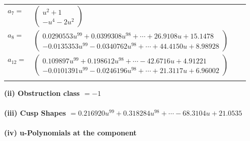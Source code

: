 \documentclass[1p]{elsarticle_modified}
\theoremstyle{definition}
\begin{document}
\begin{tabular}{m{7pt} m{180pt} m{7pt} m{180pt} }
\flushright $a_{7}=$&$\begin{pmatrix}u^2+1\\- u^4-2 u^2\end{pmatrix}$ \\
\flushright $a_{8}=$&$\begin{pmatrix}0.0290553 u^{99}+0.0399308 u^{98}+\cdots+26.9108 u+15.1478\\-0.0135353 u^{99}-0.0340762 u^{98}+\cdots+44.4150 u+8.98928\end{pmatrix}$ \\
\flushright $a_{12}=$&$\begin{pmatrix}0.109897 u^{99}+0.198612 u^{98}+\cdots-42.6716 u+4.91221\\-0.0101391 u^{99}-0.0246196 u^{98}+\cdots+21.3117 u+6.96002\end{pmatrix}$\\&\end{tabular}
\flushleft \textbf{(ii) Obstruction class $= -1$}\\~\\
\flushleft \textbf{(iii) Cusp Shapes $= 0.216920 u^{99}+0.318284 u^{98}+\cdots-68.3104 u+21.0535$}\\~\\
\newpage\renewcommand{\arraystretch}{1}
\flushleft \textbf{(iv) u-Polynomials at the component}\newline \\
\end{document}
